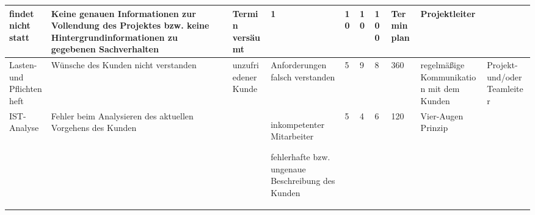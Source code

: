 \begin{center}
{\begin{tabular}{|p{1.5cm}|p{1.5cm}|p{1.7cm}|p{1.5cm}|p{0.25cm}|p{0.25cm}|p{0.25cm}|p{0.5cm}|p{1.5cm}|p{1.5cm}|}
{
	findet nicht statt
}&

{
	Keine genauen Informationen zur Vollendung des Projektes bzw. keine Hintergrundinformationen zu gegebenen Sachverhalten
}&

{
	Termin vers\"{a}umt
}&

{
	1
}&

{
	10
}&

{
	10
}&

{
	100
}&

{
	Terminplan
}&

{
	Projektleiter
}\\ \hline
%
%
{
	Lasten- und Pflichtenheft
}&

{
	W\"{u}nsche des Kunden nicht verstanden
}&

{
	unzufriedener Kunde
}&

{
	Anforderungen falsch verstanden
}&

{
	5
}&

{
	9
}&

{
	8
}&

{
	360
}&

{
	regelm\"{a}\ss{}ige Kommunikation mit dem Kunden
}&

{
	Projekt- und/oder Teamleiter
}\\ \hline
%
%
{
	IST-Analyse
}&

{
	Fehler beim Analysieren des aktuellen Vorgehens des Kunden
}&

{
	
}&	

{
	inkompetenter Mitarbeiter \par\medskip
	fehlerhafte bzw. ungenaue Beschreibung des Kunden
}&

{
	5
}&

{
	4
}&

{
	6
}&

{
	120
}&

{
	Vier-Augen Prinzip
}&


\end{tabular}}
\end{center}
